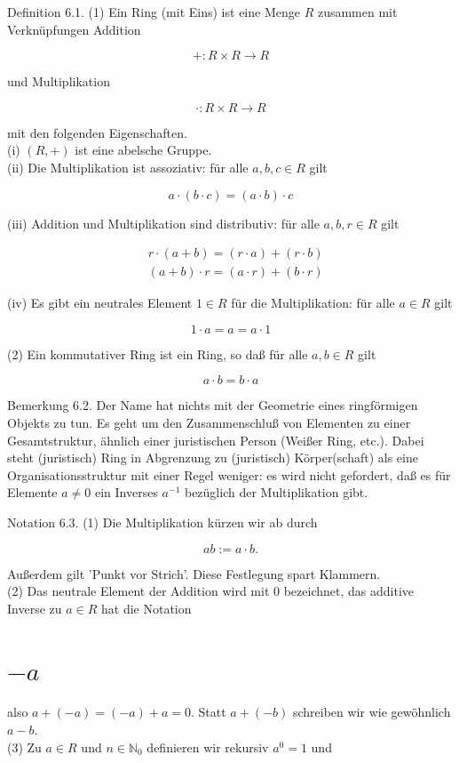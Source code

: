 \documentclass[10pt, letterpaper]{article}
\begin{document}
Definition 6.1. (1) Ein Ring (mit Eins) ist eine Menge $R$ zusammen mit Verknüpfungen Addition

$$
+: R \times R \rightarrow R
$$

und Multiplikation

$$
\cdot: R \times R \rightarrow R
$$

mit den folgenden Eigenschaften.\\
(i) $(R,+)$ ist eine abelsche Gruppe.\\
(ii) Die Multiplikation ist assoziativ: für alle $a, b, c \in R$ gilt

$$
a \cdot(b \cdot c)=(a \cdot b) \cdot c
$$

(iii) Addition und Multiplikation sind distributiv: für alle $a, b, r \in R$ gilt

$$
\begin{aligned}
& r \cdot(a+b)=(r \cdot a)+(r \cdot b) \\
& (a+b) \cdot r=(a \cdot r)+(b \cdot r)
\end{aligned}
$$

(iv) Es gibt ein neutrales Element $1 \in R$ für die Multiplikation: für alle $a \in R$ gilt

$$
1 \cdot a=a=a \cdot 1
$$

(2) Ein kommutativer Ring ist ein Ring, so daß für alle $a, b \in R$ gilt

$$
a \cdot b=b \cdot a
$$

Bemerkung 6.2. Der Name hat nichts mit der Geometrie eines ringförmigen Objekts zu tun. Es geht um den Zusammenschluß von Elementen zu einer Gesamtstruktur, ähnlich einer juristischen Person (Weißer Ring, etc.). Dabei steht (juristisch) Ring in Abgrenzung zu (juristisch) Körper(schaft) als eine Organisationsstruktur mit einer Regel weniger: es wird nicht gefordert, daß es für Elemente $a \neq 0$ ein Inverses $a^{-1}$ bezüglich der Multiplikation gibt.

Notation 6.3. (1) Die Multiplikation kürzen wir ab durch

$$
a b:=a \cdot b .
$$

Außerdem gilt 'Punkt vor Strich'. Diese Festlegung spart Klammern.\\
(2) Das neutrale Element der Addition wird mit 0 bezeichnet, das additive Inverse zu $a \in R$ hat die Notation

\section*{$-a$}
also $a+(-a)=(-a)+a=0$. Statt $a+(-b)$ schreiben wir wie gewöhnlich $a-b$.\\
(3) Zu $a \in R$ und $n \in \mathbb{N}_{0}$ definieren wir rekursiv $a^{0}=1$ und
\end{document}
